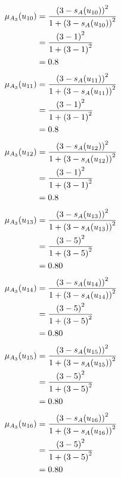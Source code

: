 \documentclass[a4paper]{book}
\begin{document}
				\begin{align}
					\mu_{A_3}(u_{10}) &= \frac{\left(3-s_A(u_{10})\right)^2}{1 + \left(3-s_A(u_{10})\right)^2}\\
					&= \frac{\left(3-1\right)^2}{1 + \left(3-1\right)^2} \notag \\
					&= 0.8 \notag
				\end{align}
				\begin{align}
					\mu_{A_3}(u_{11}) &= \frac{\left(3-s_A(u_{11})\right)^2}{1 + \left(3-s_A(u_{11})\right)^2}\\
					&= \frac{\left(3-1\right)^2}{1 + \left(3-1\right)^2} \notag \\
					&= 0.8 \notag
				\end{align}
				\begin{align}
					\mu_{A_3}(u_{12}) &= \frac{\left(3-s_A(u_{12})\right)^2}{1 + \left(3-s_A(u_{12})\right)^2}\\
					&= \frac{\left(3-1\right)^2}{1 + \left(3-1\right)^2} \notag \\
					&= 0.8 \notag
				\end{align}
				\begin{align}
					\mu_{A_3}(u_{13}) &= \frac{\left(3-s_A(u_{13})\right)^2}{1 + \left(3-s_A(u_{13})\right)^2}\\
					&= \frac{\left(3-5\right)^2}{1 + \left(3-5\right)^2} \notag \\
					&= 0.80 \notag
				\end{align}
				\begin{align}
					\mu_{A_3}(u_{14}) &= \frac{\left(3-s_A(u_{14})\right)^2}{1 + \left(3-s_A(u_{14})\right)^2}\\
					&= \frac{\left(3-5\right)^2}{1 + \left(3-5\right)^2} \notag \\
					&= 0.80 \notag
				\end{align}
				\begin{align}
					\mu_{A_3}(u_{15}) &= \frac{\left(3-s_A(u_{15})\right)^2}{1 + \left(3-s_A(u_{15})\right)^2}\\
					&= \frac{\left(3-5\right)^2}{1 + \left(3-5\right)^2} \notag \\
					&= 0.80 \notag
				\end{align}
				\begin{align}
					\mu_{A_3}(u_{16}) &= \frac{\left(3-s_A(u_{16})\right)^2}{1 + \left(3-s_A(u_{16})\right)^2}\\
					&= \frac{\left(3-5\right)^2}{1 + \left(3-5\right)^2} \notag \\
					&= 0.80 \notag
				\end{align}
\end{document}
